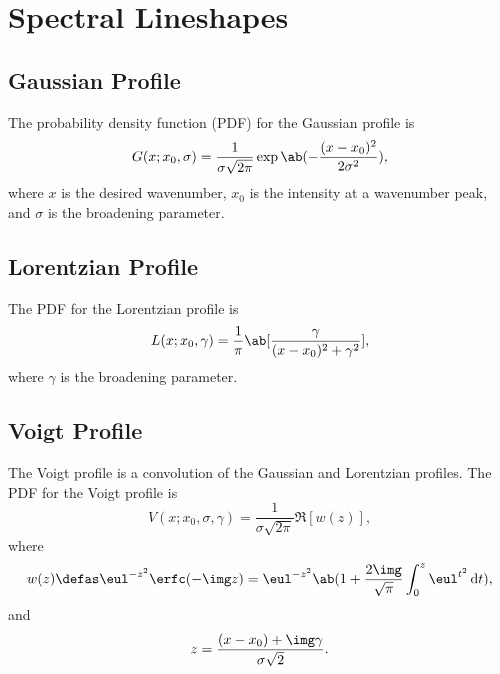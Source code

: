 \chapter{Spectral Lineshapes}
\label{c:spectral_lineshapes}

\section{Gaussian Profile}
\label{s:gaussian_profile}

The probability density function (PDF) for the Gaussian profile is
\begin{equation*}
    G(x; x_{0}, \sigma) = \frac{1}{\sigma\sqrt{2\pi}}\exp\ab(-\frac{(x - x_{0})^{2}}{2\sigma^{2}}),
\end{equation*}
where $x$ is the desired wavenumber, $x_{0}$ is the intensity at a wavenumber peak, and $\sigma$ is the broadening parameter.

\section{Lorentzian Profile}
\label{s:lorentzian_profile}

The PDF for the Lorentzian profile is
\begin{equation*}
    L(x; x_{0}, \gamma) = \frac{1}{\pi}\ab[\frac{\gamma}{(x - x_{0})^{2} + \gamma^{2}}],
\end{equation*}
where $\gamma$ is the broadening parameter.

\section{Voigt Profile}
\label{s:voigt_profile}

The Voigt profile is a convolution of the Gaussian and Lorentzian profiles. The PDF for the Voigt profile is
\begin{equation*}
    V(x; x_{0}, \sigma, \gamma) = \frac{1}{\sigma\sqrt{2\pi}}\Re[w(z)],
\end{equation*}
where
\begin{equation*}
    w(z) \defas \eul^{-z^{2}}\erfc(-\img z) = \eul^{-z^{2}}\ab(1 +
    \frac{2\img}{\sqrt{\pi}}\int_{0}^{z} \eul^{t^{2}} \odif{t}),
\end{equation*}
and
\begin{equation*}
    z = \frac{(x - x_{0}) + \img\gamma}{\sigma\sqrt{2}}.
\end{equation*}

